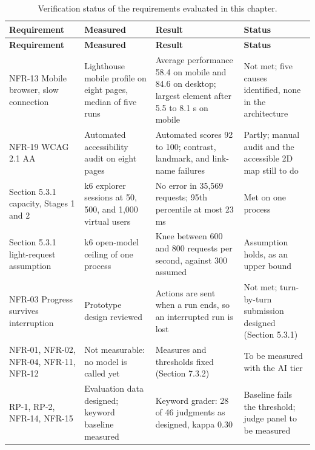 {\small{}\renewcommand{\arraystretch}{1.1}
\begin{longtable}{|>{\raggedright\arraybackslash}p{}|>{\raggedright\arraybackslash}p{}|>{\raggedright\arraybackslash}p{}|>{\raggedright\arraybackslash}p{}|}
\caption{Verification status of the requirements evaluated in this chapter.} \\
\hline
\textbf{Requirement} & \textbf{Measured} & \textbf{Result} & \textbf{Status} \\ \hline
\endfirsthead
\hline
\textbf{Requirement} & \textbf{Measured} & \textbf{Result} & \textbf{Status} \\ \hline
\endhead
NFR-13 Mobile browser, slow connection & Lighthouse mobile profile on eight pages, median of five runs & Average performance 58.4 on mobile and 84.6 on desktop; largest element after 5.5 to 8.1 s on mobile & Not met; five causes identified, none in the architecture \\ \hline
NFR-19 WCAG 2.1 AA & Automated accessibility audit on eight pages & Automated scores 92 to 100; contrast, landmark, and link-name failures & Partly; manual audit and the accessible 2D map still to do \\ \hline
Section 5.3.1 capacity, Stages 1 and 2 & k6 explorer sessions at 50, 500, and 1,000 virtual users & No error in 35,569 requests; 95th percentile at most 23 ms & Met on one process \\ \hline
Section 5.3.1 light-\allowbreak{}request assumption & k6 open-model ceiling of one process & Knee between 600 and 800 requests per second, against 300 assumed & Assumption holds, as an upper bound \\ \hline
NFR-03 Progress survives interruption & Prototype design reviewed & Actions are sent when a run ends, so an interrupted run is lost & Not met; turn-\allowbreak{}by-\allowbreak{}turn submission designed (Section 5.3.1) \\ \hline
NFR-01, NFR-02, NFR-04, NFR-11, NFR-12 & Not measurable: no model is called yet & Measures and thresholds fixed (Section 7.3.2) & To be measured with the AI tier \\ \hline
RP-1, RP-2, NFR-14, NFR-15 & Evaluation data designed; keyword baseline measured & Keyword grader: 28 of 46 judgments as designed, kappa 0.30 & Baseline fails the threshold; judge panel to be measured \\ \hline
\end{longtable}
}

